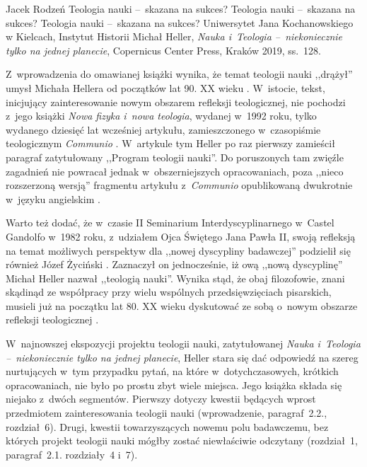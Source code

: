 \begin{newrevplenv}{Jacek Rodzeń}
	{Teologia nauki --~skazana na sukces?}
	{Teologia nauki --~skazana na sukces?}
	{Teologia nauki --~skazana na sukces?}
	{Uniwersytet Jana Kochanowskiego w Kielcach, Instytut Historii}
	{Michał Heller, \textit{Nauka i~Teologia --~niekoniecznie tylko na jednej planecie}, Copernicus Center Press, Kraków 2019, ss.~128.\label{rodzen_anfang}}





\lettrine[loversize=0.13,lines=2,lraise=-0.03,nindent=0em,findent=0.2pt]%
{Z}{}~wprowadzenia do omawianej książki wynika, że temat teologii nauki ,,drążył'' umysł Michała Hellera od początków lat 90. XX wieku
\parencite[][s.~8]{heller_nauka_2019}. %
 W~istocie, tekst, inicjujący zainteresowanie nowym obszarem refleksji teologicznej, nie pochodzi z~jego książki \textit{Nowa fizyka i~nowa teologia}, wydanej w~1992 roku, tylko wydanego dziesięć lat wcześniej artykułu, zamieszczonego w~czasopiśmie teologicznym \textit{Communio}
\parencite[][]{heller_stworzenie_1982}. %
 W~artykule tym Heller po raz pierwszy zamieścił paragraf zatytułowany ,,Program teologii nauki''. Do poruszonych tam zwięźle zagadnień nie powracał jednak w~obszerniejszych opracowaniach, poza ,,nieco rozszerzoną wersją'' 
\parencite[][s.~8]{heller_nauka_2019} %
 fragmentu artykułu z~\textit{Communio} opublikowaną dwukrotnie w~języku angielskim 
\parencite[][]{heller_program_2003}.%


Warto też dodać, że w~czasie II Seminarium Interdyscyplinarnego w~Castel Gandolfo w~1982 roku, z~udziałem Ojca Świętego Jana Pawła II, swoją refleksją na temat możliwych perspektyw dla ,,nowej dyscypliny badawczej'' podzielił się również Józef Życiński
\parencite*[][]{zycinski_w_1984}. %
 Zaznaczył on jednocześnie, iż ową ,,nową dyscyplinę'' Michał Heller nazwał ,,teologią nauki''. Wynika stąd, że obaj filozofowie, znani skądinąd ze współpracy przy wielu wspólnych przedsięwzięciach pisarskich, musieli już na początku lat 80. XX wieku dyskutować ze sobą o~nowym obszarze refleksji teologicznej 
\parencite[więcej na ten temat zob.][]{polak_teologia_2015}.%


W~najnowszej ekspozycji projektu teologii nauki, zatytułowanej \textit{Nauka i~Teologia --~niekoniecznie tylko na jednej planecie}, Heller stara się dać odpowiedź na szereg nurtujących w~tym przypadku pytań, na które w~dotychczasowych, krótkich opracowaniach, nie było po prostu zbyt wiele miejsca. Jego książka składa się niejako z~dwóch segmentów. Pierwszy dotyczy kwestii będących wprost przedmiotem zainteresowania teologii nauki (wprowadzenie, paragraf~2.2., rozdział~6). Drugi, kwestii towarzyszących nowemu polu badawczemu, bez których projekt teologii nauki mógłby zostać niewłaściwie odczytany (rozdział~1, paragraf~2.1. rozdziały~4 i~7).


\end{newrevplenv}
